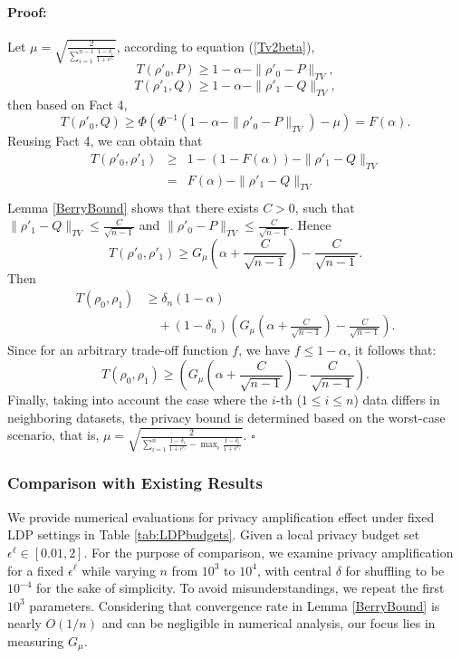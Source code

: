 \documentclass[letterpaper]{article} %
\newenvironment{proof}{\paragraph{Proof:}}{\hfill$\square$}
\begin{document}
\begin{proof}
Let $\mu = \sqrt{\frac{2}{\sum_{i=1}^{n-1} \frac{1-\delta_i}{1+e^{\epsilon_i}}}}$,
according to equation (\ref{Tv2beta}), $$T(\rho'_0,P) \ge 1- \alpha - \|\rho'_0-P\|_{TV},$$
$$T(\rho'_1,Q) \ge 1- \alpha - \|\rho'_1-Q\|_{TV},$$
then based on Fact 4, $$T(\rho'_0,Q) \ge \Phi(\Phi^{-1}(1- \alpha-\|\rho'_0-P\|_{TV})-\mu)= F(\alpha).$$
Reusing Fact 4, we can obtain that
\begin{eqnarray}    \label{eq}
T(\rho'_0,\rho'_1)&\ge&1-(1-F(\alpha))- \|\rho'_1-Q\|_{TV} \nonumber    \\
~&=&F(\alpha)- \|\rho'_1-Q\|_{TV} \nonumber    \\
\end{eqnarray}
%
Lemma \ref{BerryBound} shows that there exists $C>0$, such that $\|\rho'_1-Q\|_{TV} \le \frac{C}{\sqrt{n-1}}$
and $\|\rho'_0-P\|_{TV} \le \frac{C}{\sqrt{n-1}}$. Hence
$$
T(\rho'_0,\rho'_1) \ge G_\mu\left({\alpha+\frac{C}{\sqrt{n-1}}}\right)-\frac{C}{\sqrt{n-1}}.
$$
Then
\begin{equation*}
\begin{split}
T(\rho_0,\rho_1) &\ge \delta_{n}(1-\alpha) \\
&\quad +(1-\delta_{n})\left(G_\mu\left({\alpha+\frac{C}{\sqrt{n-1}}}\right)-\frac{C}{\sqrt{n-1}}\right).
\end{split}
\end{equation*}
Since for an arbitrary trade-off function $f$, we have $f \le 1-\alpha$, it follows that:
$$
T(\rho_0,\rho_1) \ge \left(G_\mu\left(\alpha+\frac{C}{\sqrt{n-1}}\right)-\frac{C}{\sqrt{n-1}}\right).
$$
Finally, taking into account the case where the $i$-th ($1\le i \le n$) data  differs in neighboring datasets, the privacy bound is determined based on the worst-case scenario, that is,
$
\mu = \sqrt{\frac{2}{\sum_{i=1}^{n} \frac{1-\delta_i}{1+e^{\epsilon_i}}-\max_{i}{\frac{1-\delta_{i}}{1+e^{\epsilon_{i}}}}}}.
$
\end{proof}
\subsubsection*{Comparison with Existing Results}
We provide numerical evaluations for privacy amplification effect under fixed LDP settings in Table \ref{tab:LDPbudgets}.
Given a local privacy budget set $\epsilon^\ell \in [0.01,2]$.
For the purpose of comparison, we examine privacy amplification for a fixed $\epsilon^\ell$ while varying $n$ from $10^3$ to $10^4$, with central $\delta$ for shuffling to be $10^{-4}$ for the sake of simplicity. To avoid misunderstandings, we repeat the first $10^3$ parameters. Considering that convergence rate in Lemma \ref{BerryBound} is nearly $O(1/n)$ and can be negligible in numerical analysis, our focus lies in measuring $G_\mu$.
\end{document}

